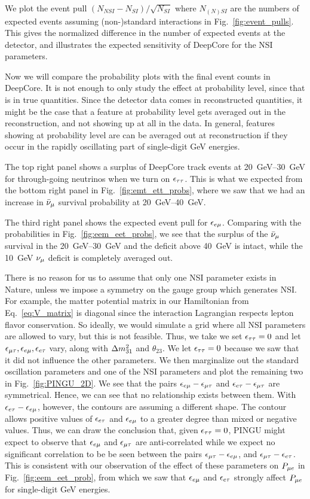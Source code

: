 {{We plot the event pull $(N_{NSI} - N_{SI})/\sqrt{N_{SI}}$ where $N_{(N)SI}$ are the numbers of expected events
assuming (non-)standard interactions in Fig.~\ref{fig:event_pulls}. This gives the normalized difference in the
number of expected events at the detector, and illustrates the expected sensitivity of DeepCore for the NSI parameters.

Now we will compare the probability plots with the final event counts in DeepCore. It is not enough to only study the effect at probability level, since that is in true quantities. 
Since the detector data comes in reconstructed quantities, it might be the case that a feature at probability level gets averaged out in the reconstruction, and not showing up at all in the data. 
In general, features showing at probability level are can be 
averaged out at reconstruction if they occur in the rapidly oscillating part of single-digit \si{\GeV} energies. 

The top right panel shows a surplus of DeepCore track events at \SIrange{20}{30}{\GeV} for through-going neutrinos when we turn on $\epsilon_{\tau\tau}$. This is what we expected from the bottom right panel in Fig.~\ref{fig:emt_ett_probs}, where we saw that we had an increase in $\bar{\nu}_\mu$ survival probability at \SIrange{20}{40}{\GeV}. 

The third right panel shows the expected event pull for $\epsilon_{e\mu}$. Comparing with the probabilities in Fig.~\ref{fig:eem_eet_probs}, we see that the surplus of the $\bar{\nu}_\mu$ survival in the \SIrange{20}{30}{\GeV} and the deficit above \SI{40}{\GeV} is intact, while the \SI{10}{\GeV} $\nu_\mu$ deficit is completely averaged out.

There is no reason for us to assume that only one NSI parameter exists in Nature, unless we impose a symmetry on the gauge group which generates NSI. For example, the matter potential matrix in our Hamiltonian from Eq.~\eqref{eq:V_matrix} is diagonal since the 
interaction Lagrangian respects lepton flavor conservation. So ideally, we would simulate a grid where all NSI parameters are allowed to vary, 
but this is not feasible. Thus, we take we set $\epsilon_{\tau\tau} = 0$ and let $\epsilon_{\mu\tau},\epsilon_{e\mu},\epsilon_{e\tau}$ vary, along with $\dm[31]$ and $\theta_{23}$. We let $\epsilon_{\tau\tau}=0$ because we saw that it did not influence the other parameters. 
We then marginalize out the standard oscillation parameters and one of the NSI parameters and plot the remaining two in Fig.~\ref{fig:PINGU_2D}. We see that the pairs $\epsilon_{e\mu} - \epsilon_{\mu\tau}$ and $\epsilon_{e\tau} - \epsilon_{\mu\tau}$ are symmetrical. 
Hence, we can see that no relationship exists between them. With $\epsilon_{e\tau} - \epsilon_{e\mu}$, however, the contours are assuming a different shape. The contour allows positive values of $\epsilon_{e\tau}$ and $\epsilon_{e\mu}$ to a greater degree than mixed or negative values.
Thus, we can draw the conclusion that, given $\epsilon_{\tau\tau} = 0$, PINGU might expect to observe that $\epsilon_{e\mu}$ and $\epsilon_{\mu\tau}$ are anti-correlated while we expect no significant correlation
to be be seen between the pairs $\epsilon_{\mu\tau} - \epsilon_{e\mu}$, and $\epsilon_{\mu\tau} - \epsilon_{e\tau}$. This is consistent with our observation of the effect of these parameters on $P_{\mu e}$ in  Fig.~\ref{fig:eem_eet_prob}, from which we 
saw that $\epsilon_{e\mu}$ and $\epsilon_{e\tau}$ strongly affect $P_{\mu e}$ for single-digit \si{\GeV} energies.

}}
